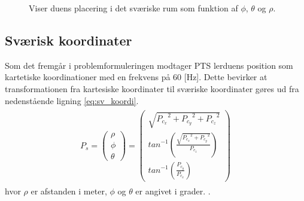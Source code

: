 \begin{figure}[!th]
\centering
\begin{tikzpicture}[scale=4]

\end{tikzpicture}
\caption[Sværisk koordinatsystem til koordinattransformation]{Viser duens placering i det sværiske rum som funktion af  \(\phi\), \(\theta\) og \(\rho\).}
\label{fig:thetaphi_degree}
\end{figure}

\subsection{Sværisk koordinater}
Som det fremgår i problemformuleringen modtager PTS lerduens position som kartetiske koordinationer med en frekvens på 60 [Hz]. Dette bevirker at transformationen fra kartesiske koordinater til sværiske koordinater gøres ud fra nedenstående ligning \ref{eq:sv_koordi}.
\begin{align}
\begin{split}
{ P }_{ s } =\left( \begin{matrix} \rho  \\ \phi  \\ \theta  \end{matrix} \right) =\left( \begin{matrix} \sqrt { { { P }_{ c_{ x } } }^{ 2 }+{ { P }_{ c_{ y } } }^{ 2 }+{ { P }_{ c_{ z } } }^{ 2 } }  \\ { tan }^{ -1 }\left( \frac { \sqrt { { { P }_{ c_{ x } } }^{ 2 }+{ { P }_{ c_{ y } } }^{ 2 } }  }{ { P }_{ c_{ z } } }  \right)  \\ { tan }^{ -1 }\left( \frac { { P }_{ c_{ y } } }{ { P }_{ c_{ x } } }  \right)  \end{matrix} \right) %
\label{eq:sv_koordi}
\end{split}
\end{align}
hvor \(\rho\) er afstanden i meter, \(\phi\) og \(\theta\) er angivet i grader. \citep[Kap. 10.6, s. 598]{adam}.
